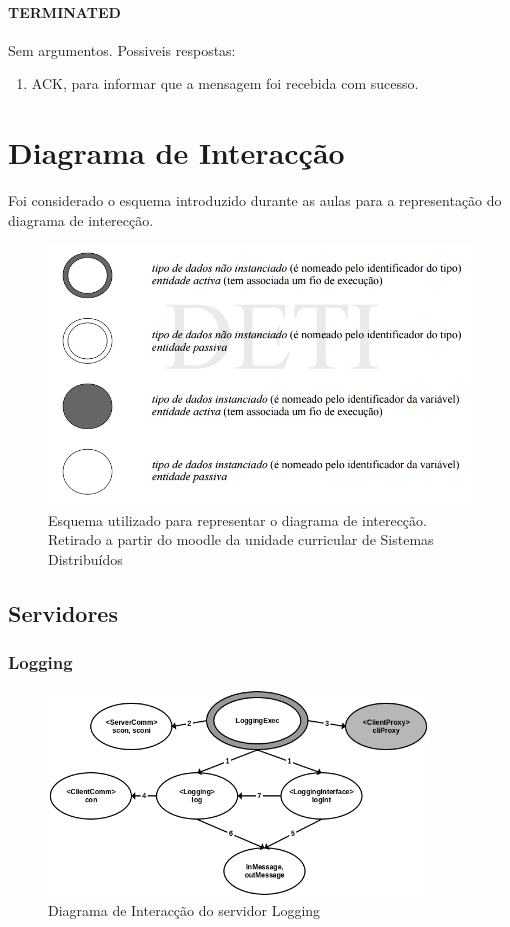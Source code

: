 \documentclass[11pt,a4paper]{report}
\begin{document}
\subsubsection{TERMINATED}
Sem argumentos.
Possiveis respostas: 
\begin{enumerate}
\itemsep-0.4em 
\item ACK, para informar que a mensagem foi recebida com sucesso.
\end{enumerate}

\chapter{Diagrama de Interacção}

Foi considerado o esquema introduzido durante as aulas para a representação do diagrama de interecção.

\begin{figure}[h]
    \centering
    \includegraphics[width=1\textwidth]{images/schema.png}
    \caption{Esquema utilizado para representar o diagrama de interecção. Retirado a partir do moodle da unidade curricular de Sistemas Distribuídos}
    \label{fig:awesome_image}
\end{figure}
\newpage
\section{Servidores}

\subsection{Logging}
\begin{figure}[h]
    \centering
    \includegraphics[width=0.9\textwidth]{images/logging.png}
    \caption{Diagrama de Interacção do servidor Logging}
    \label{fig:awesome_image}
\end{figure}
\end{document}
